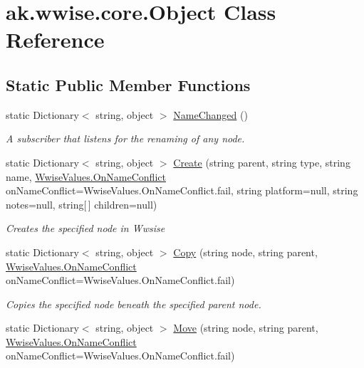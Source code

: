 \hypertarget{classak_1_1wwise_1_1core_1_1_object}{}\section{ak.\+wwise.\+core.\+Object Class Reference}
\label{classak_1_1wwise_1_1core_1_1_object}
\subsection*{Static Public Member Functions}
\begin{DoxyCompactItemize}
\item 
static Dictionary$<$ string, object $>$ \mbox{\hyperlink{classak_1_1wwise_1_1core_1_1_object_a737e01ae91795f37872b7f34e9ac747a}{Name\+Changed}} ()
\begin{DoxyCompactList}\small\item\em A subscriber that listens for the renaming of any node. \end{DoxyCompactList}\item 
static Dictionary$<$ string, object $>$ \mbox{\hyperlink{classak_1_1wwise_1_1core_1_1_object_af766d3b435d3f33d2edc2772d7b9d492}{Create}} (string parent, string type, string name, \mbox{\hyperlink{class_waapi_c_s_1_1_custom_values_1_1_wwise_values_a672159d5ad63bd0a752a5607f4ad6cd9}{Wwise\+Values.\+On\+Name\+Conflict}} on\+Name\+Conflict=Wwise\+Values.\+On\+Name\+Conflict.\+fail, string platform=null, string notes=null, string\mbox{[}$\,$\mbox{]} children=null)
\begin{DoxyCompactList}\small\item\em Creates the specified node in Wwsise \end{DoxyCompactList}\item 
static Dictionary$<$ string, object $>$ \mbox{\hyperlink{classak_1_1wwise_1_1core_1_1_object_af763dc1db56eaab3aaace67d4655194d}{Copy}} (string node, string parent, \mbox{\hyperlink{class_waapi_c_s_1_1_custom_values_1_1_wwise_values_a672159d5ad63bd0a752a5607f4ad6cd9}{Wwise\+Values.\+On\+Name\+Conflict}} on\+Name\+Conflict=Wwise\+Values.\+On\+Name\+Conflict.\+fail)
\begin{DoxyCompactList}\small\item\em Copies the specified node beneath the specified parent node. \end{DoxyCompactList}\item 
static Dictionary$<$ string, object $>$ \mbox{\hyperlink{classak_1_1wwise_1_1core_1_1_object_ac29dd5adea4117df8c9eac008e030320}{Move}} (string node, string parent, \mbox{\hyperlink{class_waapi_c_s_1_1_custom_values_1_1_wwise_values_a672159d5ad63bd0a752a5607f4ad6cd9}{Wwise\+Values.\+On\+Name\+Conflict}} on\+Name\+Conflict=Wwise\+Values.\+On\+Name\+Conflict.\+fail)

\end{DoxyCompactItemize}
